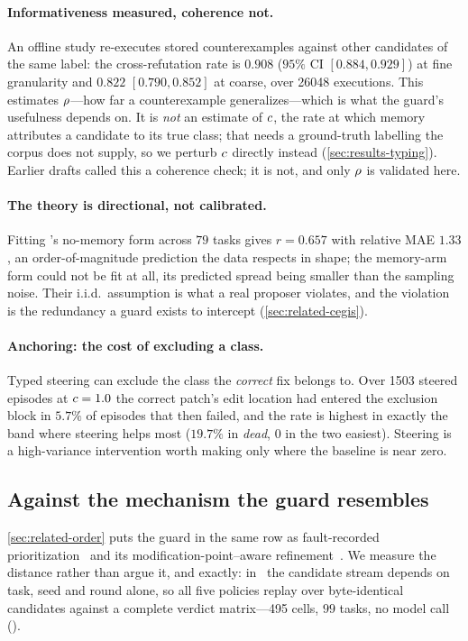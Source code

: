 \paragraph{Informativeness measured, coherence not.}
An offline study re-executes stored counterexamples against other candidates of
the same label: the cross-refutation rate is $0.908$ ($95\%$ CI
$[0.884, 0.929]$) at fine granularity and $0.822$ $[0.790, 0.852]$ at coarse,
over \num{26048} executions. This estimates $\rho$---how far a counterexample
generalizes---which is what the guard's usefulness depends on. It is \emph{not}
an estimate of $c$, the rate at which memory attributes a candidate to its
true class; that needs a ground-truth labelling the corpus does not supply, so
we perturb $c$ directly instead (\cref{sec:results-typing}). Earlier drafts
called this a coherence check; it is not, and only $\rho$ is validated here.

\paragraph{The theory is directional, not calibrated.}
Fitting \Rredund's no-memory form across $79$ tasks gives $r = 0.657$ with
relative MAE $1.33$, an order-of-magnitude prediction the data respects in
shape; the memory-arm form could not be fit at all, its predicted spread being
smaller than the sampling noise. Their
i.i.d.\ assumption is what a real proposer violates, and the violation is the
redundancy a guard exists to intercept (\cref{sec:related-cegis}).

\paragraph{Anchoring: the cost of excluding a class.}
Typed steering can exclude the class the \emph{correct} fix belongs to. Over
\num{1503} steered episodes at $c = 1.0$ the correct patch's edit location
had entered the exclusion block in $5.7\%$ of episodes that then failed, and
the rate is highest in exactly the band where steering helps most ($19.7\%$ in
\emph{dead}, $0$ in the two easiest). Steering is a high-variance intervention
worth making only where the baseline is near zero.

\subsection{Against the mechanism the guard resembles}
\label{sec:results-policies}

\cref{sec:related-order} puts the guard in the same row as fault-recorded
prioritization~\cite{qi2013efficient} and its modification-point--aware
refinement~\cite{venugopal2020modification}. We measure the distance rather
than argue it, and exactly: in \armnomem\ the candidate stream depends on task,
seed and round alone, so all five policies replay over byte-identical
candidates against a complete verdict matrix---\num{495} cells, $99$ tasks, no
model call ().

